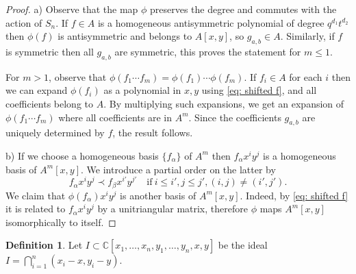 \documentclass[12pt]{amsart}
\newcommand{\C}{\mathbb{C}}
\numberwithin{equation}{section}
\theoremstyle{definition}
\newtheorem{remark}[theorem]{Remark}
\newtheorem{definition}[theorem]{Definition}
\begin{document}
\begin{proof}
a)  Observe that  the map $\phi$  preserves the degree and commutes with the action of $S_n$. If $f\in A$ is a homogeneous antisymmetric polynomial of degree $q^{d_1}t^{d_2}$ then  $\phi(f)$ is antisymmetric and belongs to $A[x,y]$, so $g_{a,b}\in A$. Similarly, if $f$ is symmetric then all $g_{a,b}$ are symmetric, this proves the statement for $m\le 1$. 

For $m>1$, observe that $\phi(f_1\cdots f_m)=\phi(f_1)\cdots \phi(f_m)$. If $f_i\in A$ for each $i$ then we can expand $\phi(f_i)$ as a polynomial in $x,y$ using \eqref{eq: shifted f}, and all coefficients belong to $A$. By multiplying such expansions, we get an expansion of $\phi(f_1\cdots f_m)$ where all coefficients are in $A^m$. Since the coefficients $g_{a,b}$ are uniquely determined by $f$, the result follows.  

b) If we choose a homogeneous basis $\{f_\alpha\}$ of $A^m$ then $f_{\alpha}x^iy^j$ is a homogeneous basis of $A^m[x,y]$. We introduce a partial order on the latter by 
$$
f_{\alpha}x^iy^j\prec f_{\beta}x^{i'}y^{j'}\quad \mathrm{if}\ i\le i',j\le j', (i,j)\neq (i',j').
$$
We claim that $\phi(f_{\alpha})x^iy^j$ is another basis of $A^m[x,y]$. Indeed, by \eqref{eq: shifted f} it is related to $f_{\alpha}x^iy^j$ by a unitriangular matrix, therefore $\phi$ maps $A^m[x,y]$ isomorphically to itself.
\end{proof}



\begin{definition}
Let $I\subset \C[x_1,\ldots,x_n,y_1,\ldots,y_n,x,y]$ be the ideal 
$
I = \bigcap_{i=1}^n (x_i-x,y_i-y).$
\end{definition}
\end{document}
